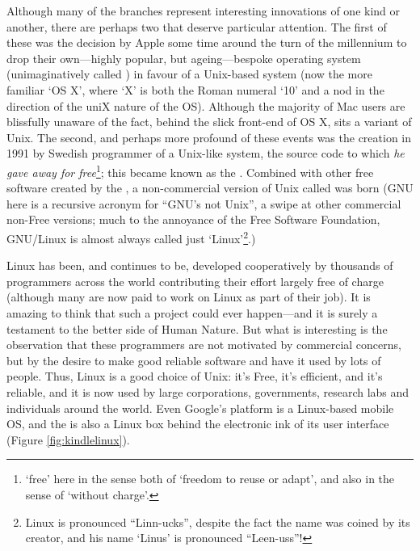 Although many of the branches represent interesting innovations of one kind or another, there are perhaps two that deserve particular attention. The first of these was the decision by Apple some time around the turn of the millennium to drop their own---highly popular, but ageing---bespoke operating system (unimaginatively called ) in favour of a Unix-based system (now the more familiar `OS X', where `X' is both the Roman numeral `10' and a nod in the direction of the uniX nature of the OS). Although the majority of Mac users are blissfully unaware of the fact, behind the slick front-end of OS X, sits a variant of Unix. The second, and perhaps more profound of these events was the creation in 1991 by Swedish programmer  of a Unix-like system, the source code to which \emph{he gave away for free}\footnote{`free' here in the sense both of `freedom to reuse or adapt', and also in the sense of `without charge'.}; this became known as the . Combined with other free software created by the , a non-commercial version of Unix called  was born (GNU here is a recursive acronym for ``GNU's not Unix'', a swipe at other commercial non-Free versions; much to the annoyance of the Free Software Foundation, GNU/Linux is almost always called just `Linux'\footnote{Linux
is pronounced ``Linn-ucks'', despite the fact the name was coined by
its creator, and his name `Linus' is pronounced
``Leen-uss''!}.)

Linux has been, and continues to be, developed cooperatively by
thousands of programmers across the world contributing their effort
largely free of charge (although many are now paid to work on Linux as part
of their job). It is amazing to think that such
a project could ever happen---and it is surely a testament to the
better side of Human Nature. But what is interesting is the
observation that these programmers are not motivated by commercial
concerns, but by the desire to make good reliable software and have it
used by lots of people. Thus, Linux is a good choice of Unix: it's
Free, it's efficient, and it's reliable, and it is now used by large corporations, governments, research labs and individuals around the world. Even Google's  platform is a Linux-based mobile OS, and the   is also a Linux box behind the electronic ink of its user interface (Figure \ref{fig:kindlelinux}).

